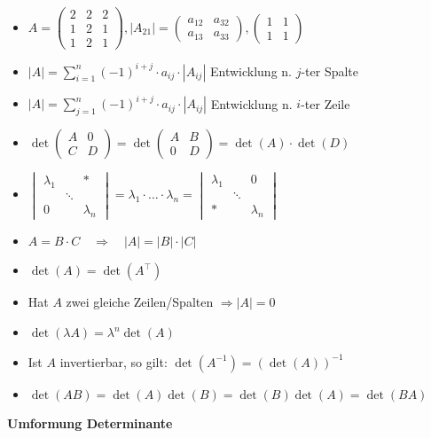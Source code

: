 \documentclass[6pt,a4paper]{scrartcl}
\newcommand{\C}{\ensuremath{\mathbb C}}
\begin{document}
\begin{multicols*}{4}
				\begin{itemize}\itemsep0pt
				\item $A=\begin{pmatrix}2&2&2\\1&2&1\\1&2&1\end{pmatrix},|A_{21}| = \begin{pmatrix}a_{12}&a_{32}\\a_{13}&a_{33}\end{pmatrix},\begin{pmatrix}1&1\\1&1\end{pmatrix} $ 
					\item $|A|=\sum\limits_{i=1}^n (-1)^{i+j} \cdot a_{ij} \cdot |A_{ij}|$ \qquad Entwicklung n. $j$-ter Spalte
					\item $|A|=\sum\limits_{j=1}^n (-1)^{i+j} \cdot a_{ij} \cdot |A_{ij}|$ \qquad Entwicklung n. $i$-ter Zeile
					\item $\det\begin{pmatrix}A&0\\C&D\end{pmatrix}=\det\begin{pmatrix}A&B\\0&D\end{pmatrix}=\det(A)\cdot\det(D)$
					\item $\begin{vmatrix}\lambda_1&&* \\ &\ddots& \\ 0&&\lambda_n \end{vmatrix} = \lambda_1\cdot \ldots\cdot \lambda_n = \begin{vmatrix} \lambda_1&&0  \\  &\ddots& \\  *&&\lambda_n \end{vmatrix}$
					\item $A=B \cdot C \quad \Rightarrow \quad |A|=|B| \cdot |C|$
					\item $\det(A)=\det(A^\top)$
					\item Hat $A$ zwei gleiche Zeilen/Spalten $\Rightarrow |A|=0$
					\item $\det(\lambda A)=\lambda^n \det(A)$
					\item Ist $A$ invertierbar, so gilt: $\det(A^{-1})=(\det(A))^{-1}$
					\item $\det(AB) = \det(A) \det(B) = \det(B) \det(A) = \det(BA)$
				\end{itemize}
				\textbf{Umformung Determinante}

\end{multicols*}
\end{document}
